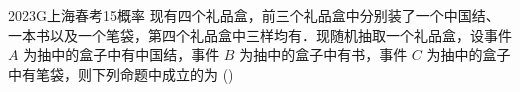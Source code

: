 
\begin{problem}{2023}{G}{上海春考}{15}{概率}
现有四个礼品盒，前三个礼品盒中分别装了一个中国结、一本书以及一个笔袋，第四个礼品盒中三样均有．现随机抽取一个礼品盒，设事件 $A$ 为抽中的盒子中有中国结，事件 $B$ 为抽中的盒子中有书，事件 $C$ 为抽中的盒子中有笔袋，则下列命题中成立的为 (\hspace{1cm})
\begin{choices}
\end{choices}
\end{problem}

\begin{answer}

\end{answer}

\begin{solutions}

\end{solutions}
